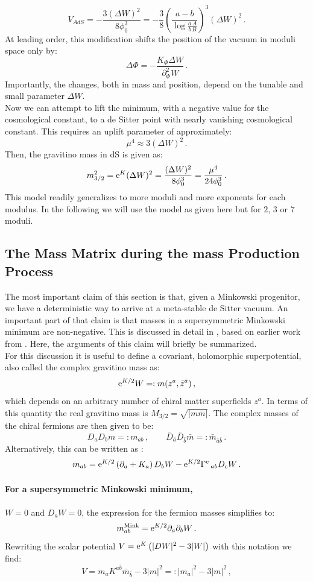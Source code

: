 \documentclass[a4paper,12pt,twoside,openright]{report}
\newcommand{\be}{\begin{equation}}
\newcommand{\ee}{\end{equation}}
\def\rme{{\rm e}}
\begin{document}
\be 
V_{AdS} = - \frac{3(\Delta W)^2}{8 \phi_0^3} = -\frac{3}{8} \left(\frac{a-b}{\log \frac{a\, A}{b\,B}}\right)^3 (\Delta W)^2\,.
\ee
At leading order, this modification shifts the position of the vacuum in moduli space only by:
\be 
\Delta \Phi = - \frac{K_\Phi \Delta W}{\partial_\Phi^2 W}\,.
\ee
Importantly, the changes, both in mass and position, depend on the tunable and small parameter $\Delta W$.\\
Now we can attempt to lift the minimum, with a negative value for the cosmological constant, to a de Sitter point with nearly vanishing cosmological constant. This requires an uplift parameter of approximately:
\be 
\mu^4 \approx 3 (\Delta W)^2\,.
\ee
Then, the gravitino mass in dS is given as:
\be 
m_{3/2}^2 = \rme^K (\Delta W)^2 = \frac{(\Delta W)^2}{8 \phi_0^3} =  \frac{\mu^4}{24\phi_0^3}\,.
\ee
This model readily generalizes to more moduli and more exponents for each modulus. In the following we will use the model as given here but for $2$, $3$ or $7$ moduli.

\subsection{The Mass Matrix during the mass Production Process}
\label{sec:massmass}
The most important claim of this section is that, given a Minkowski progenitor, we have a deterministic way to arrive at a meta-stable de Sitter vacuum. An important part of that claim is that masses in a supersymmetric Minkowski minimum are non-negative. This is discussed in detail in \cite{Kallosh:2019zgd}, based on earlier work from \cite{BlancoPillado:2005fn}. Here, the arguments of this claim will briefly be summarized.\\
For this discussion it is useful to define a covariant, holomorphic superpotential, also called the complex gravitino mass as:
\be 
\rme^{K/2} W =: m(z^a,\bar{z}^{\bar{a}})\,,
\ee
which depends on an arbitrary number of chiral matter superfields $z^a$. In terms of this quantity the real gravitino mass is $M_{3/2} = \sqrt{|m\bar{m}|}$. The complex masses of the chiral fermions are then given to be:
\be 
D_a D_b m =: m_{ab}\,,\qquad \bar{D}_{\bar{a}}\bar{D}_{\bar{b}}\bar{m} =: \bar{m}_{\bar{a}\bar{b}}\,.
\ee
Alternatively, this can be written as \cite{Freedman:2012zz}:
\be 
m_{ab} = \rme^{K/2} \left(\partial_a + K_a\right) D_b W - \rme^{K/2} \Gamma^{c}\,_{ab} D_c W\,.
\ee
\paragraph{For a supersymmetric Minkowski minimum,} $W = 0$ and $D_aW=0$, the expression for the fermion masses simplifies to:
\be 
m_{ab}^{\text{Mink}} = \rme^{K/2} \partial_a \partial_b W\,.
\ee
Rewriting the scalar potential $V=\rme^K \left(|DW|^2 - 3 |W|\right)$ with this notation we find:
\be 
V = m_a K^{a\bar{b}}\bar{m}_{\bar{b}} - 3 |m|^2 =: |m_a|^2 - 3 |m|^2\,,
\ee
\end{document}

